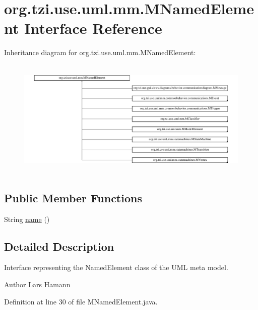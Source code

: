 \hypertarget{interfaceorg_1_1tzi_1_1use_1_1uml_1_1mm_1_1_m_named_element}{\section{org.\-tzi.\-use.\-uml.\-mm.\-M\-Named\-Element Interface Reference}
\label{interfaceorg_1_1tzi_1_1use_1_1uml_1_1mm_1_1_m_named_element}
}
Inheritance diagram for org.\-tzi.\-use.\-uml.\-mm.\-M\-Named\-Element\-:\begin{figure}[H]
\begin{center}
\leavevmode
\includegraphics[height=5.688488cm]{interfaceorg_1_1tzi_1_1use_1_1uml_1_1mm_1_1_m_named_element}
\end{center}
\end{figure}
\subsection*{Public Member Functions}
\begin{DoxyCompactItemize}
\item 
String \hyperlink{interfaceorg_1_1tzi_1_1use_1_1uml_1_1mm_1_1_m_named_element_af39159f41090d3cacd3dd088f8a6cc42}{name} ()
\end{DoxyCompactItemize}


\subsection{Detailed Description}
Interface representing the Named\-Element class of the U\-M\-L meta model. \begin{DoxyAuthor}{Author}
Lars Hamann 
\end{DoxyAuthor}


Definition at line 30 of file M\-Named\-Element.\-java.



